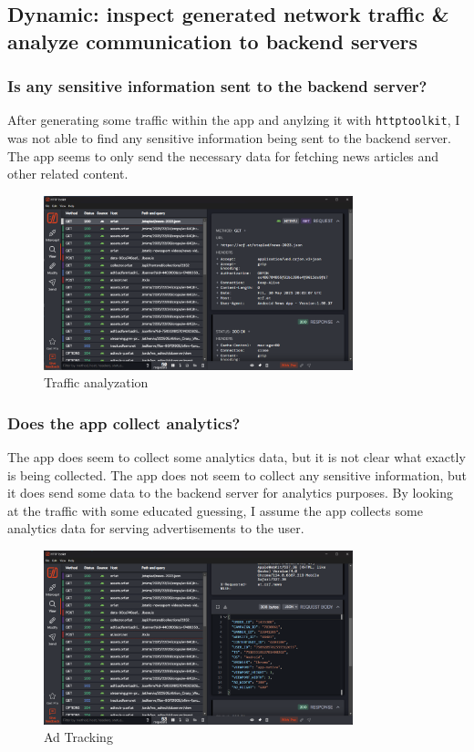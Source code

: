 \documentclass[12pt,a4paper]{article}
\begin{document}
\subsection{Dynamic: inspect generated network traffic \& analyze communication to backend servers}

\subsubsection{Is any sensitive information sent to the backend server?}

After generating some traffic within the app and anylzing it with \texttt{httptoolkit}, I was not able to find any sensitive information being sent to the backend server. 
The app seems to only send the necessary data for fetching news articles and other related content.

\begin{figure}[H]
\centering
\includegraphics[width=0.8\textwidth]{./screenshots/Traffic_analyzation.png}
\caption{Traffic analyzation}
\end{figure}

\subsubsection{Does the app collect analytics?}

The app does seem to collect some analytics data, but it is not clear what exactly is being collected. The app does not seem to collect any sensitive information, but it does send some data to the backend server for analytics purposes.
By looking at the traffic with some educated guessing, I assume the app collects some analytics data for serving advertisements to the user.

\begin{figure}[H]
\centering
\includegraphics[width=0.8\textwidth]{./screenshots/ad_tracking.png}
\caption{Ad Tracking}
\end{figure}
\end{document}
